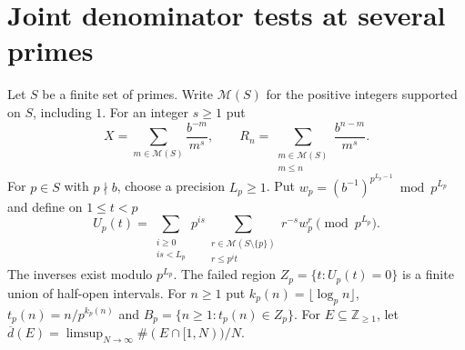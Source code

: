 \documentclass[11pt]{article}
\newcommand{\Z}{\mathbb Z}
\begin{document}
\section{Joint denominator tests at several primes}\label{sec:joint}
Let \(S\) be a finite set of primes. Write \(\mathcal M(S)\) for the positive integers supported on \(S\), including \(1\). For an integer \(s\ge1\) put
\[
 X=\sum_{m\in\mathcal M(S)}\frac{b^{-m}}{m^s},
 \qquad R_n=\sum_{\substack{m\in\mathcal M(S)\\m\le n}}\frac{b^{n-m}}{m^s}.
\]
For \(p\in S\) with \(p\nmid b\), choose a precision \(L_p\ge1\). Put \(w_p=(b^{-1})^{p^{L_p-1}}\bmod p^{L_p}\) and define on \(1\le t<p\)
\begin{equation}\label{eq:res}
 U_p(t)=\sum_{\substack{i\ge0\\is<L_p}} p^{is}
   \sum_{\substack{r\in\mathcal M(S\setminus\{p\})\\r\le p^i t}}
     r^{-s}w_p^r \pmod {p^{L_p}} .
\end{equation}
The inverses exist modulo \(p^{L_p}\). The failed region \(Z_p=\{t:U_p(t)=0\}\) is a finite union of half-open intervals. For \(n\ge1\) put \(k_p(n)=\lfloor\log_p n\rfloor\), \(t_p(n)=n/p^{k_p(n)}\) and \(B_p=\{n\ge1:t_p(n)\in Z_p\}\). For \(E\subseteq\Z_{\ge1}\), let \(\overline d(E)=\limsup_{N\to\infty}\#(E\cap[1,N))/N\).
\end{document}
